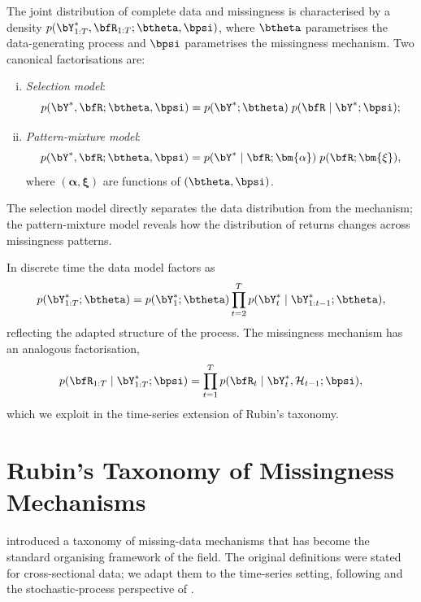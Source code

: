 \begin{definition}
\label{def:joint_factorisation}
The joint distribution of complete data and missingness is characterised by a
density $p(\bY_{1:T}^*,\bfR_{1:T};\btheta,\bpsi)$, where $\btheta$
parametrises the data-generating process and $\bpsi$ parametrises the
missingness mechanism.  Two canonical factorisations are:
\begin{enumerate}[(i)]
  \item \emph{Selection model}:
        \[
          p(\bY^*,\bfR;\btheta,\bpsi)
          = p(\bY^*;\btheta)\;p(\bfR\mid\bY^*;\bpsi);
        \]
  \item \emph{Pattern-mixture model}:
        \[
          p(\bY^*,\bfR;\btheta,\bpsi)
          = p(\bY^*\mid\bfR;\bm{\alpha})\;p(\bfR;\bm{\xi}),
        \]
        where $(\bm{\alpha},\bm{\xi})$ are functions of $(\btheta,\bpsi)$.
\end{enumerate}
The selection model directly separates the data distribution from the
mechanism; the pattern-mixture model reveals how the distribution of returns
changes across missingness patterns.
\end{definition}

\begin{remark}
\label{rem:recursive_structure}
In discrete time the data model factors as
\[
  p(\bY_{1:T}^*;\btheta)
  = p(\bY_1^*;\btheta)\prod_{t=2}^T p(\bY_t^*\mid\bY_{1:t-1}^*;\btheta),
\]
reflecting the adapted structure of the process.  The missingness mechanism
has an analogous factorisation,
\[
  p(\bfR_{1:T}\mid\bY_{1:T}^*;\bpsi)
  = \prod_{t=1}^T p(\bfR_t\mid\bY_t^*,\mathcal{H}_{t-1};\bpsi),
\]
which we exploit in the time-series extension of Rubin's taxonomy.
\end{remark}

\section{Rubin's Taxonomy of Missingness Mechanisms}
\label{sec:rubin}

\citet{rubin1976} introduced a taxonomy of missing-data mechanisms that has
become the standard organising framework of the field.  The original
definitions were stated for cross-sectional data; we adapt them to the
time-series setting, following \citet{little2019} and the stochastic-process
perspective of \citet{mar_stochastic2022}.

